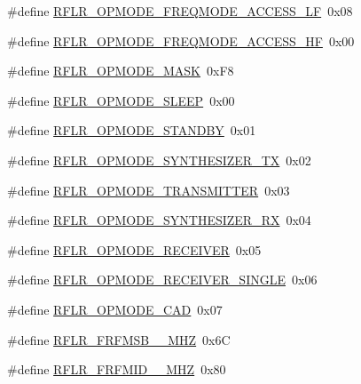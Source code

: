 \begin{DoxyCompactItemize}
\item 
\#define \mbox{\hyperlink{sx1276_regs-_lo_ra_8h_ac3b485df85439dc57b6ff9fa4b4e7178}{R\+F\+L\+R\+\_\+\+O\+P\+M\+O\+D\+E\+\_\+\+F\+R\+E\+Q\+M\+O\+D\+E\+\_\+\+A\+C\+C\+E\+S\+S\+\_\+\+LF}}~0x08
\item 
\#define \mbox{\hyperlink{sx1276_regs-_lo_ra_8h_aa8585403cacfc764a79455a2e82507bf}{R\+F\+L\+R\+\_\+\+O\+P\+M\+O\+D\+E\+\_\+\+F\+R\+E\+Q\+M\+O\+D\+E\+\_\+\+A\+C\+C\+E\+S\+S\+\_\+\+HF}}~0x00
\item 
\#define \mbox{\hyperlink{sx1276_regs-_lo_ra_8h_ae81262dc31f1b6843d2d09125dda0659}{R\+F\+L\+R\+\_\+\+O\+P\+M\+O\+D\+E\+\_\+\+M\+A\+SK}}~0x\+F8
\item 
\#define \mbox{\hyperlink{sx1276_regs-_lo_ra_8h_a042c25d6f974d449c3ba24782751cd45}{R\+F\+L\+R\+\_\+\+O\+P\+M\+O\+D\+E\+\_\+\+S\+L\+E\+EP}}~0x00
\item 
\#define \mbox{\hyperlink{sx1276_regs-_lo_ra_8h_afb7498d406642d2e07cb383010697c0a}{R\+F\+L\+R\+\_\+\+O\+P\+M\+O\+D\+E\+\_\+\+S\+T\+A\+N\+D\+BY}}~0x01
\item 
\#define \mbox{\hyperlink{sx1276_regs-_lo_ra_8h_ab5c2916d7198480084d9275020ed67f0}{R\+F\+L\+R\+\_\+\+O\+P\+M\+O\+D\+E\+\_\+\+S\+Y\+N\+T\+H\+E\+S\+I\+Z\+E\+R\+\_\+\+TX}}~0x02
\item 
\#define \mbox{\hyperlink{sx1276_regs-_lo_ra_8h_a2ccdd26a6b1283c6f8f0710b49269d02}{R\+F\+L\+R\+\_\+\+O\+P\+M\+O\+D\+E\+\_\+\+T\+R\+A\+N\+S\+M\+I\+T\+T\+ER}}~0x03
\item 
\#define \mbox{\hyperlink{sx1276_regs-_lo_ra_8h_a51b6a8bcd4bb5e0016428956ffa91794}{R\+F\+L\+R\+\_\+\+O\+P\+M\+O\+D\+E\+\_\+\+S\+Y\+N\+T\+H\+E\+S\+I\+Z\+E\+R\+\_\+\+RX}}~0x04
\item 
\#define \mbox{\hyperlink{sx1276_regs-_lo_ra_8h_a18ffa4e2930797bbeb71fd15ae77dfe0}{R\+F\+L\+R\+\_\+\+O\+P\+M\+O\+D\+E\+\_\+\+R\+E\+C\+E\+I\+V\+ER}}~0x05
\item 
\#define \mbox{\hyperlink{sx1276_regs-_lo_ra_8h_a0cfa7959ea68f8e81d1ee04e8a3ef596}{R\+F\+L\+R\+\_\+\+O\+P\+M\+O\+D\+E\+\_\+\+R\+E\+C\+E\+I\+V\+E\+R\+\_\+\+S\+I\+N\+G\+LE}}~0x06
\item 
\#define \mbox{\hyperlink{sx1276_regs-_lo_ra_8h_a8e3c7ec4d0aceedae1069a3b6d8d6bd2}{R\+F\+L\+R\+\_\+\+O\+P\+M\+O\+D\+E\+\_\+\+C\+AD}}~0x07
\item 
\#define \mbox{\hyperlink{sx1276_regs-_lo_ra_8h_ac8e626a7d3028cc58dbe937ce2cb4fef}{R\+F\+L\+R\+\_\+\+F\+R\+F\+M\+S\+B\+\_\+\_\+\+M\+HZ}}~0x6C
\item 
\#define \mbox{\hyperlink{sx1276_regs-_lo_ra_8h_a2b6e1709a469a8e5fe8c3099036576b2}{R\+F\+L\+R\+\_\+\+F\+R\+F\+M\+I\+D\+\_\+\_\+\+M\+HZ}}~0x80

\end{DoxyCompactItemize}
